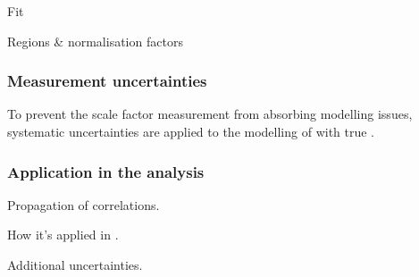 Fit \mTW

Regions \& normalisation factors








\subsubsection{Measurement uncertainties}

To prevent the scale factor measurement from absorbing modelling
issues, systematic uncertainties are applied to the modelling of
\ttbar with true \tauhadvis.


\subsubsection{Application in the analysis}

Propagation of correlations.

How it's applied in \hadhad.

Additional uncertainties.




